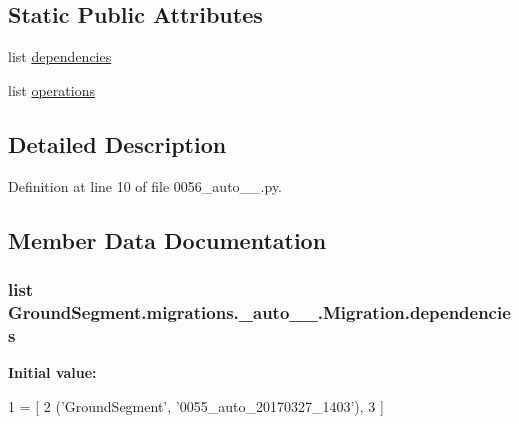 \subsection*{Static Public Attributes}
\begin{DoxyCompactItemize}
\item 
list \hyperlink{class_ground_segment_1_1migrations_1_10056__auto__20170327__1906_1_1_migration_a04755e2868241aa61e7452b53188cb05}{dependencies}
\item 
list \hyperlink{class_ground_segment_1_1migrations_1_10056__auto__20170327__1906_1_1_migration_a09dc6cfe21cc73dc107f94d34e80464b}{operations}
\end{DoxyCompactItemize}


\subsection{Detailed Description}


Definition at line 10 of file 0056\+\_\+auto\+\_\+\_.\+py.



\subsection{Member Data Documentation}
\hypertarget{class_ground_segment_1_1migrations_1_10056__auto__20170327__1906_1_1_migration_a04755e2868241aa61e7452b53188cb05}{}
\subsubsection[{dependencies}]{\setlength{\rightskip}{0pt plus 5cm}list Ground\+Segment.\+migrations.\+\_\+auto\+\_\+\_.\+Migration.\+dependencies\hspace{0.3cm}{\ttfamily [static]}}\label{class_ground_segment_1_1migrations_1_10056__auto__20170327__1906_1_1_migration_a04755e2868241aa61e7452b53188cb05}
{\bfseries Initial value\+:}
\begin{DoxyCode}
1 = [
2         (\textcolor{stringliteral}{'GroundSegment'}, \textcolor{stringliteral}{'0055\_auto\_20170327\_1403'}),
3     ]
\end{DoxyCode}


